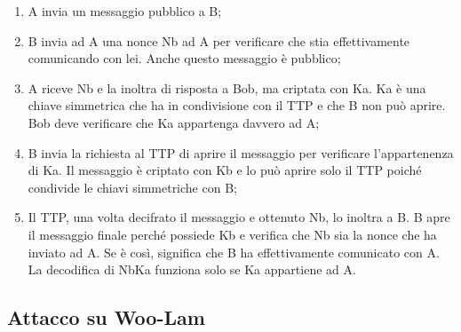 \begin{enumerate}
    \item A invia un messaggio pubblico a B;
    \item B invia ad A una nonce Nb ad A per verificare che stia
          effettivamente comunicando con lei. Anche questo messaggio è
          pubblico;
    \item A riceve Nb e la inoltra di risposta a Bob, ma criptata con
          Ka. Ka è una chiave simmetrica che ha in condivisione con il
          TTP e che B non può aprire. Bob deve verificare che Ka
          appartenga davvero ad A;
    \item B invia la richiesta al TTP di aprire il messaggio per verificare
          l’appartenenza di Ka. Il
          messaggio è criptato con Kb e lo può aprire solo il TTP poiché condivide
          le chiavi
          simmetriche con B;
    \item Il TTP, una volta decifrato il messaggio e ottenuto Nb, lo inoltra a B.
          B apre il messaggio
          finale perché possiede Kb e verifica che Nb sia la nonce che ha inviato ad A.
          Se è così,
          significa che B ha effettivamente comunicato con A. La decodifica di {Nb}Ka
          funziona solo se Ka appartiene ad A.
\end{enumerate}

\subsection{Attacco su Woo-Lam}

